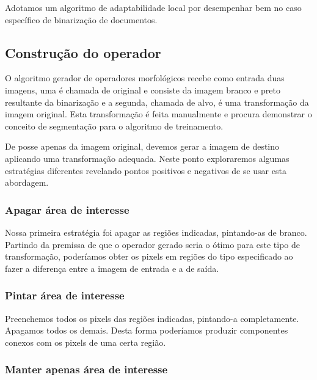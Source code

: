 \documentclass[a4paper,11pt]{article}
\begin{document}
      Adotamos um algoritmo de adaptabilidade local por desempenhar bem no caso específico de binarização de documentos.

    \subsection{Construção do operador}

      O algoritmo gerador de operadores morfológicos recebe como entrada duas imagens, uma é chamada de original e consiste da imagem branco e preto resultante da binarização e a segunda, chamada de alvo, é uma transformação da imagem original. Esta transformação é feita manualmente e procura demonstrar o conceito de segmentação para o algoritmo de treinamento.


      De posse apenas da imagem original, devemos gerar a imagem de destino aplicando uma transformação adequada. Neste ponto exploraremos algumas estratégias diferentes revelando pontos positivos e negativos de se usar esta abordagem.

      \subsubsection{Apagar área de interesse}

        Nossa primeira estratégia foi apagar as regiões indicadas, pintando-as de branco. Partindo da premissa de que o operador gerado seria o ótimo para este tipo de transformação, poderíamos obter os pixels em regiões do tipo especificado ao fazer a diferença entre a imagem de entrada e a de saída.

      \subsubsection{Pintar área de interesse}

        Preenchemos todos os pixels das regiões indicadas, pintando-a completamente. Apagamos todos os demais. Desta forma poderíamos produzir componentes conexos com os pixels de uma certa região.

      \subsubsection{Manter apenas área de interesse}
\end{document}
